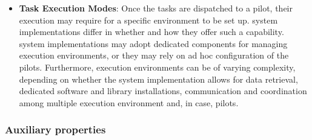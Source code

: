 \documentclass{sig-alternate}
\begin{document}
\begin{itemize}
\item \textbf{Task Execution Modes}: Once the tasks are dispatched to
  a pilot, their execution may require for a specific environment to
  be set up.  \pilot system implementations differ in whether and how they
  offer such a capability. \pilot system implementations may adopt
  dedicated components for managing execution environments, or they
  may rely on ad hoc configuration of the pilots. Furthermore,
  execution environments can be of varying complexity, depending on
  whether the \pilot system implementation allows for data retrieval,
  dedicated software and library installations, communication and
  coordination among multiple execution environment and, in case,
  pilots.

\end{itemize}


\subsubsection{Auxiliary properties}
\label{sec:auxprops}
\end{document}
